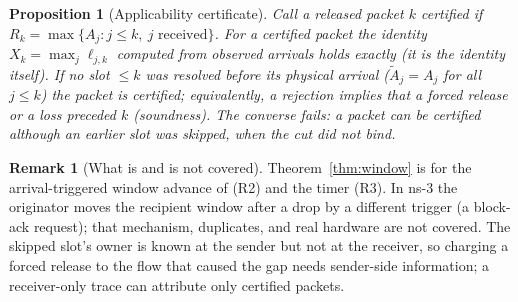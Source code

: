 \documentclass[11pt]{article}
\newtheorem{proposition}{Proposition}
\theoremstyle{definition}
\newtheorem{remark}{Remark}
\begin{document}
\begin{proposition}[Applicability certificate]\label{prop:applic}
Call a released packet $k$ \emph{certified} if $R_k=\max\{A_j:j\le k,\ j\text{ received}\}$. For a certified packet the identity $X_k=\max_j\ell_{j,k}$ computed from observed arrivals holds exactly (it is the identity itself). If no slot $\le k$ was resolved before its physical arrival ($\tilde A_j=A_j$ for all $j\le k$) the packet is certified; equivalently, a rejection implies that a forced release or a loss preceded $k$ (soundness). The converse fails: a packet can be certified although an earlier slot was skipped, when the cut did not bind.
\end{proposition}
\begin{remark}[What is and is not covered]
Theorem~\ref{thm:window} is for the arrival-triggered window advance of (R2) and the timer (R3). In ns-3 the originator moves the recipient window after a drop by a different trigger (a block-ack request); that mechanism, duplicates, and real hardware are not covered. The skipped slot's owner is known at the sender but not at the receiver, so charging a forced release to the flow that caused the gap needs sender-side information; a receiver-only trace can attribute only certified packets.
\end{remark}
\end{document}
